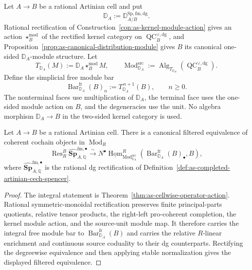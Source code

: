\begin{definition}
\label{def:as-distribution-module-bar}
Let $A\to B$ be a rational Artinian cell and put
\[
    \mathbb D_A
    :=
    \mathbb D_{A/B}^{\mathrm{Sp,fin,dg}}.
\]
Rational rectification of
Construction~\ref{con:as-kernel-module-action} gives an action
$\star_B^{\mathrm{mod}}$ of the rectified kernel category on
$\operatorname{QC}^{\vee,\mathrm{dg}}_B$, and
Proposition~\ref{prop:as-canonical-distribution-module} gives $B$ its
canonical one-sided $\mathbb D_A$-module structure.  Let
\[
    T_{\mathbb D_A}(M)
    :=
    \mathbb D_A\star_B^{\mathrm{mod}}M,
    \qquad
    \operatorname{Mod}^{\mathrm{src}}_{\mathbb D_A}
    :=
    \operatorname{Alg}_{T_{\mathbb D_A}}
    \left(
        \operatorname{QC}^{\vee,\mathrm{dg}}_B
    \right).
\]
Define the simplicial free module bar
\[
\boxed{
    \operatorname{Bar}^{\mathrm{fr}}_{\mathbb D_A}(B)_n
    :=
    T_{\mathbb D_A}^{\,n+1}(B),
    \qquad n\geq0.
}
\]
The nonterminal faces use multiplication of $\mathbb D_A$, the terminal face
uses the one-sided module action on $B$, and the degeneracies use the unit.
No algebra morphism $\mathbb D_A\to B$ in the two-sided kernel category is
used.
\end{definition}

\begin{lemma}
\label{lem:as-cech-distribution-bar-duality}
Let $A\to B$ be a rational Artinian cell.  There is a canonical filtered
equivalence of coherent cochain objects in $\operatorname{Mod}_R$
\[
\boxed{
    \operatorname{Res}_R^B
    \widehat{\mathbf{Sp}}_{A,\mathbb Q}^{\mathrm{fm},\bullet}
    \xrightarrow{\sim}
    N^\bullet
    \underline{\operatorname{Hom}}^R_{
        \operatorname{Mod}^{\mathrm{src}}_{\mathbb D_A}}
    \left(
        \operatorname{Bar}^{\mathrm{fr}}_{\mathbb D_A}(B)_\bullet,
        B
    \right),
}
\]
where
$\widehat{\mathbf{Sp}}_{A,\mathbb Q}^{\mathrm{fm},\bullet}$
is the rational dg rectification of
Definition~\ref{def:as-completed-artinian-cech-spencer}.
\end{lemma}

\begin{proof}
The integral statement is
Theorem~\ref{thm:as-cellwise-operator-action}.  Rational symmetric-monoidal
rectification preserves finite principal-parts quotients, relative tensor
products, the right-left pro-coherent completion, the kernel module action,
and the source-unit module map.  It therefore carries the integral free
module bar to
$\operatorname{Bar}^{\mathrm{fr}}_{\mathbb D_A}(B)$ and carries the relative
$R$-linear enrichment and continuous source coduality to their dg
counterparts.  Rectifying the degreewise
equivalence and then applying stable normalization gives the displayed
filtered equivalence.
\end{proof}

